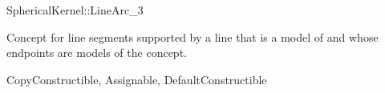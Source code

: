 \begin{ccRefConcept}{SphericalKernel::LineArc_3}

\ccDefinition

Concept for line segments supported by a line that is a model of
 and whose endpoints are models of the
 concept. 

\ccRefines
CopyConstructible, Assignable, DefaultConstructible

\ccHasModels
{}

\end{ccRefConcept}
